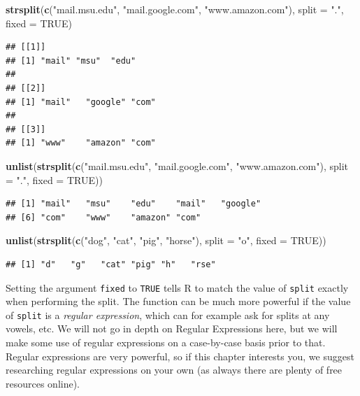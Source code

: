 \documentclass[
]{krantz}
\newenvironment{Shaded}{\begin{snugshade}}{\end{snugshade}}
\newcommand{\DataTypeTok}[1]{\textcolor[rgb]{0.13,0.29,0.53}{#1}}
\newcommand{\KeywordTok}[1]{\textcolor[rgb]{0.13,0.29,0.53}{\textbf{#1}}}
\newcommand{\NormalTok}[1]{#1}
\newcommand{\OtherTok}[1]{\textcolor[rgb]{0.56,0.35,0.01}{#1}}
\newcommand{\StringTok}[1]{\textcolor[rgb]{0.31,0.60,0.02}{#1}}
\begin{document}
\begin{Shaded}
\begin{Highlighting}[]
\KeywordTok{strsplit}\NormalTok{(}\KeywordTok{c}\NormalTok{(}\StringTok{"mail.msu.edu"}\NormalTok{, }\StringTok{"mail.google.com"}\NormalTok{, }\StringTok{"www.amazon.com"}\NormalTok{),}
         \DataTypeTok{split =} \StringTok{"."}\NormalTok{, }\DataTypeTok{fixed =} \OtherTok{TRUE}\NormalTok{)}
\end{Highlighting}
\end{Shaded}

\begin{verbatim}
## [[1]]
## [1] "mail" "msu"  "edu" 
## 
## [[2]]
## [1] "mail"   "google" "com"   
## 
## [[3]]
## [1] "www"    "amazon" "com"
\end{verbatim}

\begin{Shaded}
\begin{Highlighting}[]
\KeywordTok{unlist}\NormalTok{(}\KeywordTok{strsplit}\NormalTok{(}\KeywordTok{c}\NormalTok{(}\StringTok{"mail.msu.edu"}\NormalTok{, }\StringTok{"mail.google.com"}\NormalTok{, }\StringTok{"www.amazon.com"}\NormalTok{),}
                \DataTypeTok{split =} \StringTok{"."}\NormalTok{, }\DataTypeTok{fixed =} \OtherTok{TRUE}\NormalTok{))}
\end{Highlighting}
\end{Shaded}

\begin{verbatim}
## [1] "mail"   "msu"    "edu"    "mail"   "google"
## [6] "com"    "www"    "amazon" "com"
\end{verbatim}

\begin{Shaded}
\begin{Highlighting}[]
\KeywordTok{unlist}\NormalTok{(}\KeywordTok{strsplit}\NormalTok{(}\KeywordTok{c}\NormalTok{(}\StringTok{"dog"}\NormalTok{, }\StringTok{"cat"}\NormalTok{, }\StringTok{"pig"}\NormalTok{, }\StringTok{"horse"}\NormalTok{), }
                \DataTypeTok{split =} \StringTok{"o"}\NormalTok{, }\DataTypeTok{fixed =} \OtherTok{TRUE}\NormalTok{))}
\end{Highlighting}
\end{Shaded}

\begin{verbatim}
## [1] "d"   "g"   "cat" "pig" "h"   "rse"
\end{verbatim}

Setting the argument \texttt{fixed} to \texttt{TRUE} tells R to match the value of \texttt{split} exactly when performing the split. The function can be much more powerful if the value of \texttt{split} is a \emph{regular expression}, which can for example ask for splits at any vowels, etc. We will not go in depth on Regular Expressions here, but we will make some use of regular expressions on a case-by-case basis prior to that. Regular expressions are very powerful, so if this chapter interests you, we suggest researching regular expressions on your own (as always there are plenty of free resources online).
\end{document}
